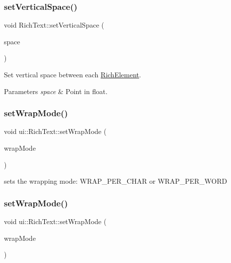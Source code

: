 \subsubsection{\texorpdfstring{set\+Vertical\+Space()}{setVerticalSpace()}\hspace{0.1cm}{\footnotesize\ttfamily [2/2]}}
{\footnotesize\ttfamily void Rich\+Text\+::set\+Vertical\+Space (\begin{DoxyParamCaption}\item[{float}]{space }\end{DoxyParamCaption})}



Set vertical space between each \hyperlink{classui_1_1RichElement}{Rich\+Element}. 


\begin{DoxyParams}{Parameters}
{\em space} & Point in float. \\
\hline
\end{DoxyParams}
\mbox{\label{classui_1_1RichText_a19f13164d96c8c3374c394c59dce40f5}} 
\subsubsection{\texorpdfstring{set\+Wrap\+Mode()}{setWrapMode()}\hspace{0.1cm}{\footnotesize\ttfamily [1/2]}}
{\footnotesize\ttfamily void ui\+::\+Rich\+Text\+::set\+Wrap\+Mode (\begin{DoxyParamCaption}\item[{Wrap\+Mode}]{wrap\+Mode }\end{DoxyParamCaption})}

sets the wrapping mode\+: W\+R\+A\+P\+\_\+\+P\+E\+R\+\_\+\+C\+H\+AR or W\+R\+A\+P\+\_\+\+P\+E\+R\+\_\+\+W\+O\+RD \mbox{\label{classui_1_1RichText_a19f13164d96c8c3374c394c59dce40f5}} 
\subsubsection{\texorpdfstring{set\+Wrap\+Mode()}{setWrapMode()}\hspace{0.1cm}{\footnotesize\ttfamily [2/2]}}
{\footnotesize\ttfamily void ui\+::\+Rich\+Text\+::set\+Wrap\+Mode (\begin{DoxyParamCaption}\item[{Wrap\+Mode}]{wrap\+Mode }\end{DoxyParamCaption})}

